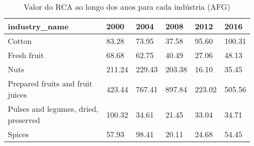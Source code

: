 \begin{table}
\centering
\caption{Valor do RCA ao longo dos anos para cada indústria (AFG)}
\begin{tabular}{p{6cm}p{1.5cm}p{1.5cm}p{1.5cm}p{1.5cm}p{1.5cm}}
\toprule
                       industry\_name &   2000 &   2004 &   2008 &   2012 &   2016 \\
\midrule
                              Cotton &  83.28 &  73.95 &  37.58 &  95.60 & 100.31 \\
                         Fresh fruit &  68.68 &  62.75 &  40.49 &  27.06 &  48.13 \\
                                Nuts & 211.24 & 229.43 & 203.38 &  16.10 &  35.45 \\
    Prepared fruits and fruit juices & 423.44 & 767.41 & 897.84 & 223.02 & 505.56 \\
Pulses and legumes, dried, preserved & 100.32 &  34.61 &  21.45 &  33.04 &  34.71 \\
                              Spices &  57.93 &  98.41 &  20.11 &  24.68 &  54.45 \\
\bottomrule
\end{tabular}
\end{table}
